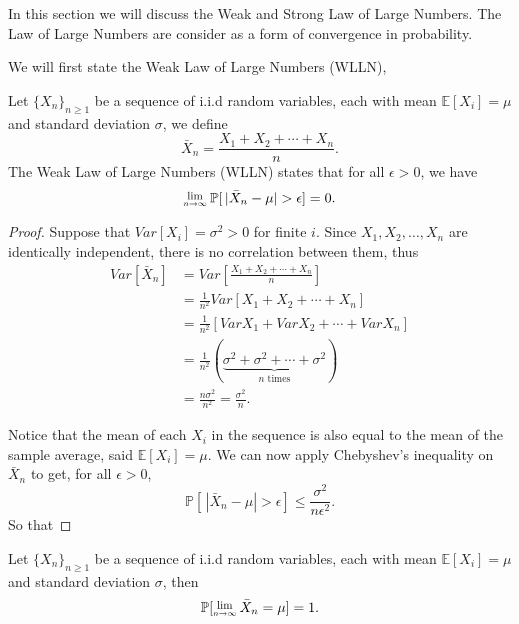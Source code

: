 In this section we will discuss the Weak and Strong Law of Large Numbers. The Law of Large 
Numbers are consider as a form of convergence in probability.

We will first state the Weak Law of Large Numbers (WLLN),

\begin{theorem}
    Let $\{X_n\}_{n \geq 1}$ be a sequence of i.i.d random variables, each with mean 
    $\mathbb{E}[X_i] = \mu$ and standard deviation $\sigma$, we define 
    \[
        \bar{X}_n = \frac{X_1 + X_2 + \cdots + X_n}{n}.
    \]
    The Weak Law of Large Numbers (WLLN) states that for all $\epsilon > 0$, we have 
    \begin{equation}
        \Lim{n \to \infty} \mathbb{P}[\, |\bar{X}_n - \mu| > \epsilon] = 0.
    \end{equation}
\end{theorem}

\begin{proof}
    Suppose that $Var[X_i] = \sigma^2 > 0$ for finite $i$. Since 
    $X_1, X_2, \ldots, X_n$ are identically independent, there is no 
    correlation between them, thus
    \begin{align*}
        Var[\bar{X}_n] &= Var \left[ \frac{X_1 + X_2 + \cdots + X_n}{n} \right]\\
        &= \frac{1}{n^2} Var[X_1 + X_2 + \cdots + X_n]\\
        &= \frac{1}{n^2} [Var X_1 + Var X_2 + \cdots + Var X_n]\\
        &= \frac{1}{n^2} (\underbrace{\sigma^2 + \sigma^2 + \cdots + \sigma^2}_{n \text{ times}})\\
        &= \frac{n\sigma^2}{n^2}
        = \frac{\sigma^2}{n}.
    \end{align*}

    Notice that the mean of each $X_i$ in the sequence is also equal to the mean of the sample average, 
    said $\mathbb{E}[X_i] = \mu$. We can now apply Chebyshev's inequality on $\bar{X}_n$ to get, for all 
    $\epsilon > 0$, 
    \[
        \mathbb{P}[\, |\bar{X}_n - \mu| > \epsilon] \leq \frac{\sigma^2}{n\epsilon^2}.
    \]
    So that 
\end{proof}

\begin{theorem}
    Let $\{X_n\}_{n \geq 1}$ be a sequence of i.i.d random variables, each with mean 
    $\mathbb{E}[X_i] = \mu$ and standard deviation $\sigma$, then 
    \begin{equation}
        \mathbb{P}[\Lim{n \to \infty} \bar{X}_n = \mu] = 1. 
    \end{equation}
\end{theorem}

